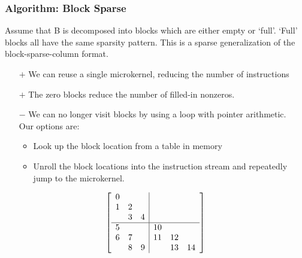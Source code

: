 \documentclass[9pt]{beamer}
\begin{document}
\begin{frame}[fragile]
  \frametitle{Algorithm: Block Sparse}
  Assume that B is decomposed into blocks which are either empty or `full'. `Full' blocks all have the same sparsity pattern. This is a sparse generalization of the block-sparse-column format.

  \begin{itemize}
  \item[$+$] We can reuse a single microkernel, reducing the number of instructions
  \item[$+$] The zero blocks reduce the number of filled-in nonzeros.
  \item[$-$] We can no longer visit blocks by using a loop with pointer arithmetic. \\Our options are:
    \begin{itemize}
    \item Look up the block location from a table in memory
    \item Unroll the block locations into the instruction stream and repeatedly jump to the microkernel.
    \end{itemize}
  \end{itemize}


      \[
      \left[
          \begin{array}{c c c | c c c }
          0 &   &   &    &    &    \\
          1 & 2 &   &    &    &    \\
            & 3 & 4 &    &    &    \\
          \hline
          5 &   &   & 10 &    &    \\
          6 & 7 &   & 11 & 12 &    \\
            & 8 & 9 &    & 13 & 14 \\
          \end{array}
          \right]
      \]
\end{frame}
\end{document}
